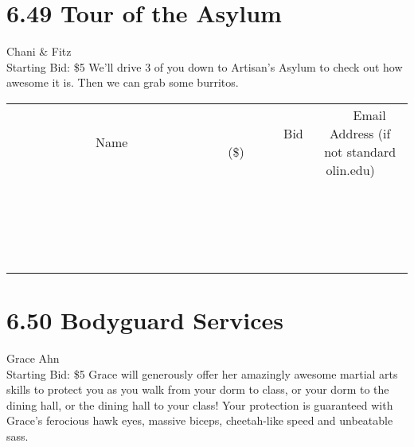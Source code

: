 \documentclass[11pt]{article}
\begin{document}
\section*{6.49 Tour of the Asylum}
Chani \& Fitz
\\
Starting Bid: \$5
\newline
We'll drive 3 of you down to Artisan's Asylum to check out how awesome it is. Then we can grab some burritos.
\\[3ex]
\begin{tabular}{c c c}
~~~~~~~~~~~~~Name~~~~~~~~~~~~~ & ~~~~~~~~~Bid (\$)~~~~~~~~~  & ~~~Email Address (if not standard olin.edu)~~~\\
 & & \\
\hline
 & & \\
\hline
 & & \\
\hline
 & & \\
\hline
 & & \\
\hline
 & & \\
\hline
 & & \\
\hline
 & & \\
\hline
 & & \\
\hline
 & & \\
\hline
 & & \\
\hline
 & & \\
\hline
 & & \\
\hline
 & & \\
\hline
 & & \\
\hline
 & & \\
\hline
 & & \\
\hline
 & & \\
\hline
 & & \\
\hline
\end{tabular}
\newpage
\section*{6.50 Bodyguard Services}
Grace Ahn
\\
Starting Bid: \$5
\newline
Grace will generously offer her amazingly awesome martial arts skills to protect you as you walk from your dorm to class, or your dorm to the dining hall, or the dining hall to your class! Your protection is guaranteed with Grace's ferocious hawk eyes, massive biceps, cheetah-like speed and unbeatable sass. 
\end{document}
